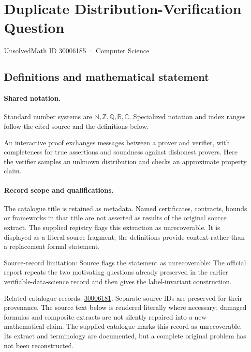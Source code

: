\documentclass[11pt]{article}
\begin{document}
\setcounter{section}{30006184}
\section{Duplicate Distribution-Verification Question}\label{30006185}
{\small\sffamily UnsolvedMath ID 30006185 · Computer Science}
\subsection{Definitions and mathematical statement}

\paragraph{Shared notation.}Standard number systems are $\mathbb N,\mathbb Z,\mathbb Q,\mathbb R,\mathbb C$. Specialized notation and index ranges follow the cited source and the definitions below.


An interactive proof exchanges messages between a prover and verifier, with completeness for true assertions and soundness against dishonest provers. Here the verifier samples an unknown distribution and checks an approximate property claim.
\paragraph{Record scope and qualifications.}
The catalogue title is retained as metadata. Named certificates, contracts, bounds or frameworks in that title are not asserted as results of the original source extract.
The supplied registry flags this extraction as unrecoverable. It is displayed as a literal source fragment; the definitions provide context rather than a replacement formal statement.

Source-record limitation: Source flags the statement as unrecoverable: The official report repeats the two motivating questions already preserved in the earlier verifiable-data-science record and then gives the label-invariant construction.

Related catalogue records: \href{https://mehmetmars7.github.io/Erdosproblems-llm-hunter/problem.html?type=open_problems&id=30006181}{30006181}. Separate source IDs are preserved for their provenance.
The source text below is rendered literally where necessary; damaged formulas and composite extracts are not silently repaired into a new mathematical claim.
The supplied catalogue marks this record as unrecoverable. Its extract and terminology are documented, but a complete original problem has not been reconstructed.
\end{document}

